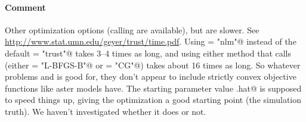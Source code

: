 \documentclass[11pt]{article}
\begin{document}
\paragraph{Comment}

Other optimization options (calling \verb@optim@ are available), but
are slower.  See \url{http://www.stat.umn.edu/geyer/trust/time.pdf}.
Using \verb@method = "nlm"@ instead of the default \verb@method = "trust"@
takes 3--4 times as long, and using either method that calls \verb@optim@
(either \verb@method = "L-BFGS-B"@ or \verb@method = "CG"@) takes about
16 times as long.
So whatever problems \verb@nlm@ and \verb@optim@ is good for,
they don't appear to include strictly convex objective functions
like aster models have.
The starting parameter value \verb@beta.hat@ is supposed to speed things
up, giving the optimization a good starting point (the simulation truth).
We haven't investigated whether it does or not.
\end{document}
